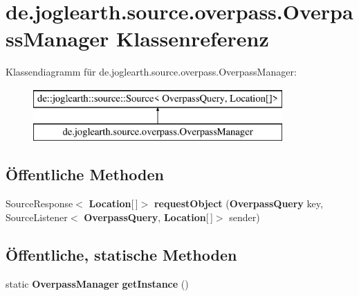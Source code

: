 \section{de.\-joglearth.\-source.\-overpass.\-Overpass\-Manager Klassenreferenz}
\label{classde_1_1joglearth_1_1source_1_1overpass_1_1_overpass_manager}
Klassendiagramm für de.\-joglearth.\-source.\-overpass.\-Overpass\-Manager\-:\begin{figure}[H]
\begin{center}
\leavevmode
\includegraphics[height=2.000000cm]{classde_1_1joglearth_1_1source_1_1overpass_1_1_overpass_manager}
\end{center}
\end{figure}
\subsection*{Öffentliche Methoden}
\begin{DoxyCompactItemize}
\item 
Source\-Response$<$ {\bf Location}[$\,$]$>$ {\bfseries request\-Object} ({\bf Overpass\-Query} key, Source\-Listener$<$ {\bf Overpass\-Query}, {\bf Location}[$\,$]$>$ sender)\label{classde_1_1joglearth_1_1source_1_1overpass_1_1_overpass_manager_a32013a111de7edf3ba2a4a8e47fcda86}

\end{DoxyCompactItemize}
\subsection*{Öffentliche, statische Methoden}
\begin{DoxyCompactItemize}
\item 
static {\bf Overpass\-Manager} {\bfseries get\-Instance} ()\label{classde_1_1joglearth_1_1source_1_1overpass_1_1_overpass_manager_aada32fad7d72548be2044392e313ef78}

\end{DoxyCompactItemize}
